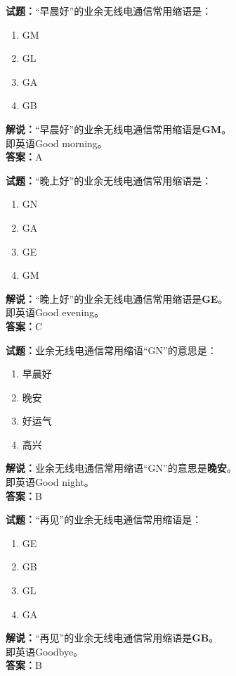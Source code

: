 \documentclass{ctexbook}
\begin{document}
\noindent\textbf{试题：}“早晨好”的业余无线电通信常用缩语是：
\begin{enumerate}[leftmargin=3em]
\item GM
\item GL
\item GA
\item GB
\end{enumerate}
\noindent\textbf{解说：}“早晨好”的业余无线电通信常用缩语是\textbf{GM}。\\即英语Good morning。\\\noindent\textbf{答案：}A


\bigskip


\noindent\textbf{试题：}“晚上好”的业余无线电通信常用缩语是：
\begin{enumerate}[leftmargin=3em]
\item GN
\item GA
\item GE
\item GM
\end{enumerate}
\noindent\textbf{解说：}“晚上好”的业余无线电通信常用缩语是\textbf{GE}。\\即英语Good evening。\\\noindent\textbf{答案：}C



\bigskip


\noindent\textbf{试题：}业余无线电通信常用缩语“GN”的意思是：
\begin{enumerate}[leftmargin=3em]
\item 早晨好
\item 晚安
\item 好运气
\item 高兴
\end{enumerate}
\noindent\textbf{解说：}业余无线电通信常用缩语“GN”的意思是\textbf{晚安}。\\即英语Good night。\\\noindent\textbf{答案：}B

\bigskip


\noindent\textbf{试题：}“再见”的业余无线电通信常用缩语是：
\begin{enumerate}[leftmargin=3em]
\item GE
\item GB
\item GL
\item GA
\end{enumerate}
\noindent\textbf{解说：}“再见”的业余无线电通信常用缩语是\textbf{GB}。\\即英语Goodbye。\\\noindent\textbf{答案：}B
\end{document}
